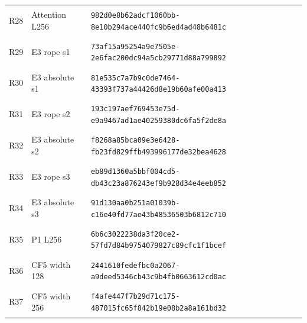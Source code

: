 \begin{longtable}{@{}l>{\raggedright\arraybackslash}p{3.5cm}p{10.8cm}@{}}
\hypertarget{R28}{R28} & Attention L256 & {\fontsize{8.8}{11}\selectfont\texttt{982d0e8b62adcf1060bb-8e10b294ace440fc9b6ed4ad48b6481c}} \\
\hypertarget{R29}{R29} & E3 rope s1 & {\fontsize{8.8}{11}\selectfont\texttt{73af15a95254a9e7505e-2e6fac200dc94a5cb29771d88a799892}} \\
\hypertarget{R30}{R30} & E3 absolute s1 & {\fontsize{8.8}{11}\selectfont\texttt{81e535c7a7b9c0de7464-43393f737a44426d8e19b60afe00a413}} \\
\hypertarget{R31}{R31} & E3 rope s2 & {\fontsize{8.8}{11}\selectfont\texttt{193c197aef769453e75d-e9a9467ad1ae40259380dc6fa5f2de8a}} \\
\hypertarget{R32}{R32} & E3 absolute s2 & {\fontsize{8.8}{11}\selectfont\texttt{f8268a85bca09e3e6428-fb23fd829ffb493996177de32bea4628}} \\
\hypertarget{R33}{R33} & E3 rope s3 & {\fontsize{8.8}{11}\selectfont\texttt{eb89d1360a5bbf004cd5-db43c23a876243ef9b928d34e4eeb852}} \\
\hypertarget{R34}{R34} & E3 absolute s3 & {\fontsize{8.8}{11}\selectfont\texttt{91d130aa0b251a01039b-c16e40fd77ae43b48536503b6812c710}} \\
\hypertarget{R35}{R35} & P1 L256 & {\fontsize{8.8}{11}\selectfont\texttt{6b6c3022238da3f20ce2-57fd7d84b9754079827c89cfc1f1bcef}} \\
\hypertarget{R36}{R36} & CF5 width 128 & {\fontsize{8.8}{11}\selectfont\texttt{2441610fedefbc0a2067-a9deed5346cb43c9b4fb0663612cd0ac}} \\
\hypertarget{R37}{R37} & CF5 width 256 & {\fontsize{8.8}{11}\selectfont\texttt{f4afe447f7b29d71c175-487015fc65f842b19e08b2a8a161bd32}} \\
\bottomrule\end{longtable}\endgroup
